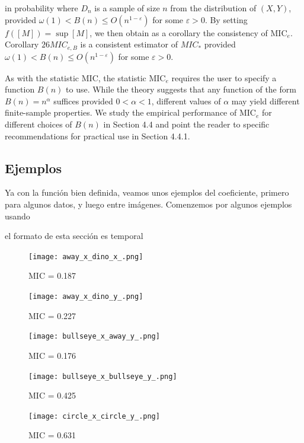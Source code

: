 	in probability where $D_n$ is a sample of size $n$ from the distribution of $(X, Y)$, provided $\omega(1)<B(n) \leq O\left(n^{1-\varepsilon}\right)$ for some $\varepsilon>0$.
	By setting $f([M])=\sup [M]$, we then obtain as a corollary the consistency of $\mathrm{MIC}_e$.
	Corollary $26 M I C_{e, B}$ is a consistent estimator of $M I C_*$ provided $\omega(1)<B(n) \leq O\left(n^{1-\varepsilon}\right)$ for some $\varepsilon>0$.

	As with the statistic $\mathrm{MIC}$, the statistic $\mathrm{MIC}_e$ requires the user to specify a function $B(n)$ to use. While the theory suggests that any function of the form $B(n)=n^\alpha$ suffices provided $0<\alpha<1$, different values of $\alpha$ may yield different finite-sample properties. We study the empirical performance of $\mathrm{MIC}_e$ for different choices of $B(n)$ in Section 4.4 and point the reader to specific recommendations for practical use in Section 4.4.1.

	\subsection[]{Ejemplos}


	Ya con la funci\'on bien definida, veamos unos ejemplos del coeficiente, primero para algunos datos, y luego entre im\'agenes. Comenzemos por algunos ejemplos usando 

	el formato de esta secci\'on es temporal

	\begin{figure}[H]
		\centering
		\texttt{[image: away\_x\_dino\_x\_.png]}
		\caption{ MIC = 0.187}
		\end{figure}
		
		\begin{figure}[H]
		\centering
		\texttt{[image: away\_x\_dino\_y\_.png]}
		\caption{ MIC = 0.227}
		\end{figure}
		
		\begin{figure}[H]
		\centering
		\texttt{[image: bullseye\_x\_away\_y\_.png]}
		\caption{ MIC = 0.176}
		\end{figure}
		
		\begin{figure}[H]
		\centering
		\texttt{[image: bullseye\_x\_bullseye\_y\_.png]}
		\caption{ MIC = 0.425}
		\end{figure}
		
		\begin{figure}[H]
		\centering
		\texttt{[image: circle\_x\_circle\_y\_.png]}
		\caption{ MIC = 0.631}
		\end{figure}
		
